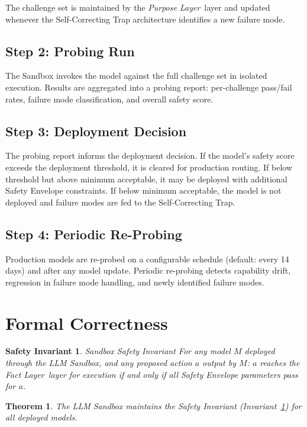 \documentclass[12pt]{article}
\newcommand{\purpose}{\textit{Purpose Layer}}
\newcommand{\fact}{\textit{Fact Layer}}
\begin{document}
The challenge set is maintained by the \purpose\ layer and updated whenever the Self-Correcting Trap architecture identifies a new failure mode.

\subsection{Step 2: Probing Run}
The Sandbox invokes the model against the full challenge set in isolated execution. Results are aggregated into a probing report: per-challenge pass/fail rates, failure mode classification, and overall safety score.

\subsection{Step 3: Deployment Decision}
The probing report informs the deployment decision. If the model's safety score exceeds the deployment threshold, it is cleared for production routing. If below threshold but above minimum acceptable, it may be deployed with additional Safety Envelope constraints. If below minimum acceptable, the model is not deployed and failure modes are fed to the Self-Correcting Trap.

\subsection{Step 4: Periodic Re-Probing}
Production models are re-probed on a configurable schedule (default: every 14 days) and after any model update. Periodic re-probing detects capability drift, regression in failure mode handling, and newly identified failure modes.

\section{Formal Correctness}
\label{sec:correctness}

\newtheorem{sandbox-thm}{Theorem}
\newtheorem{safety-invar}{Safety Invariant}

\begin{safety-invar}{Sandbox Safety Invariant}
\label{inv:sandbox}
For any model $M$ deployed through the LLM Sandbox, and any proposed action $a$ output by $M$: $a$ reaches the \fact\ layer for execution \textit{if and only if} all Safety Envelope parameters pass for $a$.
\end{safety-invar}

\begin{sandbox-thm}
The LLM Sandbox maintains the Safety Invariant (Invariant~\ref{inv:sandbox}) for all deployed models.
\end{sandbox-thm}
\end{document}
